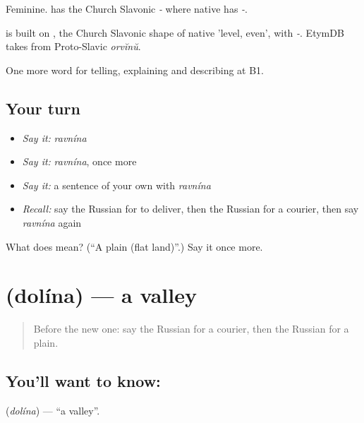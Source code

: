 Feminine. \emph{} has the Church Slavonic \emph{-} where native \emph{} has \emph{-}.

\begin{cousinweb}
\emph{} is built on \emph{}, the Church Slavonic shape of native \emph{} 'level, even', with \emph{-}. EtymDB takes \emph{} from Proto-Slavic \emph{orvĭnŭ}.
\end{cousinweb}

\begin{grammarlens}[title={What you've built}]
One more word for telling, explaining and describing at B1.
\end{grammarlens}

\subsection*{Your turn}
\begin{itemize}
\raggedright
  \item \emph{Say it:} \emph{ravnína}
  \item \emph{Say it:} \emph{ravnína}, once more
  \item \emph{Say it:} a sentence of your own with \emph{ravnína}
  \item \emph{Recall:} say the Russian for to deliver, then the Russian for a courier, then say \emph{ravnína} again
\end{itemize}

\begin{tcolorbox}[breakable,colback=teal!4,colframe=teal!35!black,title={Before you move on}]
What does  mean? (\textquotedblleft{}A plain (flat land)\textquotedblright{}.) Say it once more.
\end{tcolorbox}
\section[\texorpdfstring{\ru{долина} (dolína)}{долина (dolína)}]{ (dolína) — a valley}

\label{lesson:RU-C458-dolina}



\begin{quote}
Before the new one: say the Russian for a courier, then the Russian for a plain.
\end{quote}

\subsection*{You'll want to know: }
\textbf{} (\emph{dolína}) — \textquotedblleft{}a valley\textquotedblright{}.

